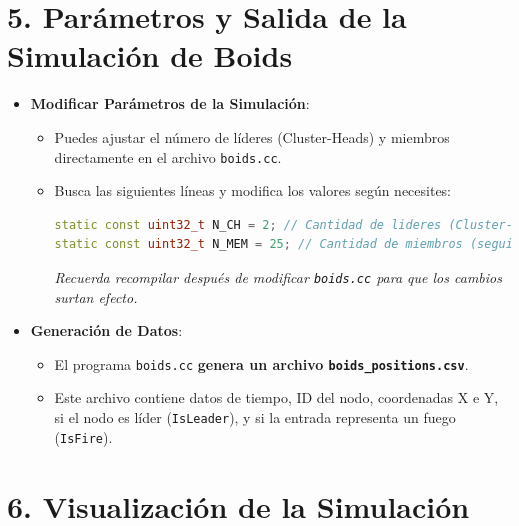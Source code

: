 \documentclass{article}
\begin{document}
\section*{\textbf{5. Parámetros y Salida de la Simulación de Boids}}

\begin{itemize}
    \item \textbf{Modificar Parámetros de la Simulación}:
    \begin{itemize}
        \item Puedes ajustar el número de líderes (Cluster-Heads) y miembros directamente en el archivo \texttt{boids.cc}.
        \item Busca las siguientes líneas y modifica los valores según necesites:
        \begin{lstlisting}[language=C++]
static const uint32_t N_CH = 2; // Cantidad de lideres (Cluster-Heads)
static const uint32_t N_MEM = 25; // Cantidad de miembros (seguidores)
        \end{lstlisting}
        \textit{Recuerda recompilar después de modificar \texttt{boids.cc} para que los cambios surtan efecto.}
    \end{itemize}
    \item \textbf{Generación de Datos}:
    \begin{itemize}
        \item El programa \texttt{boids.cc} \textbf{genera un archivo \texttt{boids\_positions.csv}}.
        \item Este archivo contiene datos de tiempo, ID del nodo, coordenadas X e Y, si el nodo es líder (\texttt{IsLeader}), y si la entrada representa un fuego (\texttt{IsFire}).
    \end{itemize}
\end{itemize}

\section*{\textbf{6. Visualización de la Simulación}}
\end{document}

